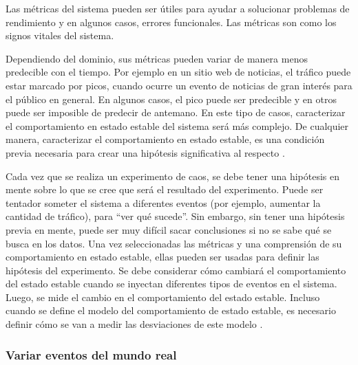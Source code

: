 \par  Las métricas del sistema pueden ser útiles para ayudar a solucionar problemas de rendimiento y en algunos casos, errores funcionales. Las métricas son como los signos vitales del sistema.\\
\par Dependiendo del dominio, sus métricas pueden variar de manera menos predecible con el tiempo. Por ejemplo en un sitio web de noticias, el tráfico puede estar marcado por picos, cuando ocurre un evento de noticias de gran interés para el público en general. En algunos casos, el pico puede ser predecible y en otros puede ser imposible de predecir de antemano. En este tipo de casos, caracterizar el comportamiento en estado estable del sistema será más complejo. De cualquier manera, caracterizar el comportamiento en estado estable, es una condición previa necesaria para crear una hipótesis significativa al respecto \cite{LIB06}.\\

\par Cada vez que se realiza un experimento de caos, se debe tener una hipótesis en mente sobre lo que se cree que será el resultado del experimento. Puede ser tentador someter el sistema a diferentes eventos (por ejemplo, aumentar la cantidad de tráfico), para ``ver qué sucede''. Sin embargo, sin tener una hipótesis previa en mente, puede ser muy difícil sacar conclusiones si no se sabe qué se busca en los datos. Una vez seleccionadas las métricas y una comprensión de su comportamiento en estado estable, ellas pueden ser usadas para definir las hipótesis del experimento. Se debe considerar cómo cambiará el comportamiento del estado estable cuando se inyectan diferentes tipos de eventos en el sistema. Luego, se mide el cambio en el comportamiento del estado estable. Incluso cuando se define el modelo del comportamiento de estado estable, es necesario definir cómo se van a medir las desviaciones de este modelo \cite{LIB06}.

\subsubsection{Variar eventos del mundo real}


